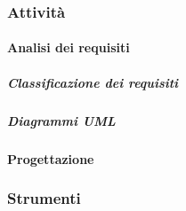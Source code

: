 \documentclass[../norme-di-progetto.tex]{subfiles}
\begin{document}
\subsubsection{Attività}
\label{subs:attività}
\paragraph{Analisi dei requisiti}
\label{par:analisi dei requisiti}
\subparagraph{Classificazione dei requisiti}
\label{subp:classificazione dei requisiti}
\subparagraph{Diagrammi UML}
\label{subp:diagrammi UML}
\paragraph{Progettazione}
\label{par:progettazione}
\subsubsection{Strumenti}
\label{subs:strumnti}
\end{document}
